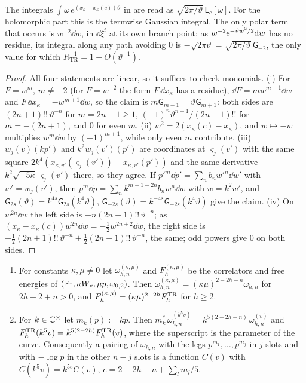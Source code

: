 The integrals $\int\omega\,e^{(x_\kappa-x_\kappa(c))\vartheta}$ in \cite[(2-31), (2-32)]{Dunin-Barkowski:2015caa} are read as $\sqrt{2\pi/\vartheta}\,\mathsf L_c[\omega]$. For the holomorphic part this is the termwise Gaussian integral. The only polar term that occurs is $w^{-2}\dd w$, in $\dd\xi^i$ at its own branch point; as $w^{-2}\mathrm{e}^{-\vartheta w^2/2}\mathrm{d} w$ has no residue, its integral along any path avoiding $0$ is $-\sqrt{2\pi\vartheta}=\sqrt{2\pi/\vartheta}\,\mathsf G_{-2}$, the only value for which $R_{\mathrm{TR}}^{-1}=1+O(\vartheta^{-1})$.

\begin{proof}
All four statements are linear, so it suffices to check monomials. (i) For $F=w^m$, $m\neq -2$ (for $F=w^{-2}$ the form $F\,\dd x_\kappa$ has a residue), $\dd F=mw^{m-1}\dd w$ and $F\,\dd x_\kappa=-w^{m+1}\dd w$, so the claim is $m\mathsf G_{m-1}=\vartheta\mathsf G_{m+1}$: both sides are $(2n+1)!!\,\vartheta^{-n}$ for $m=2n+1\geq 1$, $(-1)^n\vartheta^{n+1}/(2n-1)!!$ for $m=-(2n+1)$, and $0$ for even $m$. (ii) $w^2=2(x_\kappa(c)-x_\kappa)$, and $w\mapsto -w$ multiplies $w^m\dd w$ by $(-1)^{m+1}$, while only even $m$ contribute. (iii) $w_j(v)(kp')$ and $k^2w_j(v')(p')$ are coordinates at $\varsigma_j(v')$ with the same square $2k^4(x_{\kappa,v'}(\varsigma_j(v'))-x_{\kappa,v'}(p'))$ and the same derivative $k^2\sqrt{-5\kappa}\,\varsigma_j(v')$ there, so they agree. If $p'^m\dd p'=\sum_nb_nw'^n\dd w'$ with $w'=w_j(v')$, then $p^m\dd p=\sum_nk^{m-1-2n}b_nw^n\dd w$ with $w=k^2w'$, and $\mathsf G_{2s}(\vartheta)=k^{4s}\mathsf G_{2s}(k^4\vartheta)$, $\mathsf G_{-2s}(\vartheta)=k^{-4s}\mathsf G_{-2s}(k^4\vartheta)$ give the claim. (iv) On $w^{2n}\dd w$ the left side is $-n(2n-1)!!\,\vartheta^{-n}$; as $(x_\kappa-x_\kappa(c))w^{2n}\dd w=-\frac12w^{2n+2}\dd w$, the right side is $-\frac12(2n+1)!!\,\vartheta^{-n}+\frac12(2n-1)!!\,\vartheta^{-n}$, the same; odd powers give $0$ on both sides.
\end{proof}

\begin{lem}
\label{lem:mod-scale}
\begin{enumerate}
\item For constants $\kappa,\mu\neq 0$ let $\omega^{(\kappa,\mu)}_{h,n}$ and $F^{(\kappa,\mu)}_h$ be the correlators and free energies of $(\mathbb{P}^1,\kappa W_{v},\mu p,\omega_{0,2})$. Then $\omega^{(\kappa,\mu)}_{h,n}=(\kappa\mu)^{2-2h-n}\omega_{h,n}$ for $2h-2+n>0$, and $F^{(\kappa,\mu)}_h=(\kappa\mu)^{2-2h}F^{\mathrm{TR}}_h$ for $h\geq 2$.
\item For $k\in\mathbb{C}^\times$ let $m_k(p):=kp$. Then $m_k^*\,\omega^{(k^5v)}_{h,n}=k^{5(2-2h-n)}\,\omega^{(v)}_{h,n}$ and $F^{\mathrm{TR}}_h(k^5v)=k^{5(2-2h)}F^{\mathrm{TR}}_h(v)$, where the superscript is the parameter of the curve. Consequently a pairing of $\omega_{h,n}$ with the legs $p^{m_1},\dots,p^{m_j}$ in $j$ slots and with $-\log p$ in the other $n-j$ slots is a function $C(v)$ with $C(k^5v)=k^{5e}C(v)$, $e=2-2h-n+\sum_lm_l/5$.
\end{enumerate}
\end{lem}

